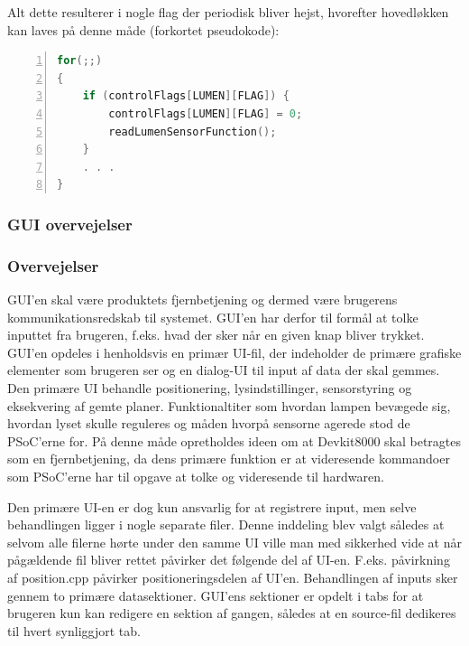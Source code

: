 Alt dette resulterer i nogle flag der periodisk bliver hejst, hvorefter hovedløkken kan laves på denne måde (forkortet pseudokode):

\begin{lstlisting}[frame=single, basicstyle=\footnotesize\ttfamily, language=C, numbers=left, numberstyle=\tiny\color{black}, caption={Pseudokode: Flag i hovedløkken},captionpos=b]
for(;;)
{
    if (controlFlags[LUMEN][FLAG]) {
        controlFlags[LUMEN][FLAG] = 0;
        readLumenSensorFunction();
    }
	. . . 
}
\end{lstlisting}

\subsubsection{GUI overvejelser}

\subsubsection{Overvejelser}

GUI’en skal være produktets fjernbetjening og dermed være brugerens kommunikationsredskab til systemet. GUI’en har derfor til formål at tolke inputtet fra brugeren, f.eks. hvad der sker når en given knap bliver trykket. 
GUI’en opdeles i henholdsvis en primær UI-fil, der indeholder de primære grafiske elementer som brugeren ser og en dialog-UI til input af data der skal gemmes. Den primære UI behandle positionering, lysindstillinger, sensorstyring og eksekvering af gemte planer. Funktionaltiter som hvordan lampen bevægede sig, hvordan lyset skulle reguleres og måden hvorpå sensorne agerede stod de PSoC'erne for. På denne måde opretholdes ideen om at Devkit8000 skal betragtes som en fjernbetjening, da dens primære funktion er at videresende kommandoer som PSoC'erne har til opgave at tolke og videresende til hardwaren.
\newline

Den primære UI-en er dog kun ansvarlig for at registrere input, men selve behandlingen ligger i nogle separate filer. Denne inddeling blev valgt således at selvom alle filerne hørte under den samme UI ville man med sikkerhed vide at når pågældende fil bliver rettet påvirker det følgende del af UI-en. F.eks. påvirkning af position.cpp påvirker positioneringsdelen af UI'en. Behandlingen af inputs sker gennem to primære datasektioner. GUI’ens sektioner er opdelt i tabs for at brugeren kun kan redigere en sektion af gangen, således at en source-fil dedikeres til hvert synliggjort tab.
\newline 

